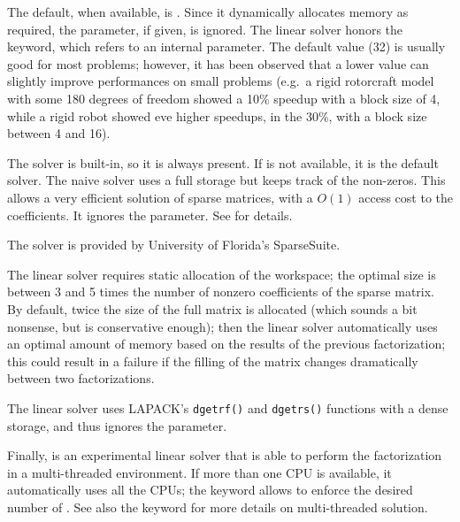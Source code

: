 The default, when available, is .
Since it dynamically allocates memory as required, the  
parameter, if given, is ignored.
The  linear solver honors the  keyword,
which refers to an internal parameter.
The default value (32) is usually good for most problems; however,
it has been observed that a lower value can slightly improve
performances on small problems (e.g.\ a rigid rotorcraft model
with some 180 degrees of freedom showed a 10\% speedup with 
a block size of 4, while a rigid robot showed eve higher speedups,
in the 30\%, with a block size between 4 and 16).

The  solver is built-in, so it is always present.
If  is not available, it is the default solver.
The naive solver uses a full storage but keeps track of the non-zeros.
This allows a very efficient solution of sparse matrices, with
a $O(1)$ access cost to the coefficients.
It ignores the  parameter.
See \cite{NAIVE-2007} for details.

The  solver is provided by University of Florida's SparseSuite.

The  linear solver requires static allocation of the workspace;
the optimal size  is between 3 and 5 times
the number of nonzero coefficients of the sparse matrix.
By default, twice the size of the full matrix is allocated
(which sounds a bit nonsense, but is conservative enough);
then the linear solver automatically uses an optimal amount of memory
based on the results of the previous factorization; this could
result in a failure if the filling of the matrix changes 
dramatically between two factorizations.

The  linear solver uses LAPACK's \texttt{dgetrf()} and \texttt{dgetrs()}
functions with a dense storage, and thus ignores the 
parameter.

Finally,  is an experimental linear solver that is able to perform
the factorization in a multi-threaded environment.
If more than one CPU is available, it automatically uses all the CPUs;
the keyword  allows to enforce the desired number of .
See also the  keyword for more details on multi-threaded
solution.

\begin{comment}
Another linear solver, that is available mostly for historical reasons, 
is \kw{harwell}, with a \nt{workspace\_size}
of $ \nt{numdofs}\times\nt{numdofs} $, but in certain cases the user
might prefer a smaller workspace, since the matrix is handled as sparse,
while sometimes a larger space is required, since when the matrix is
full, a little more space is required, due to extra storage needs when
the matrix fills up.
\end{comment}

